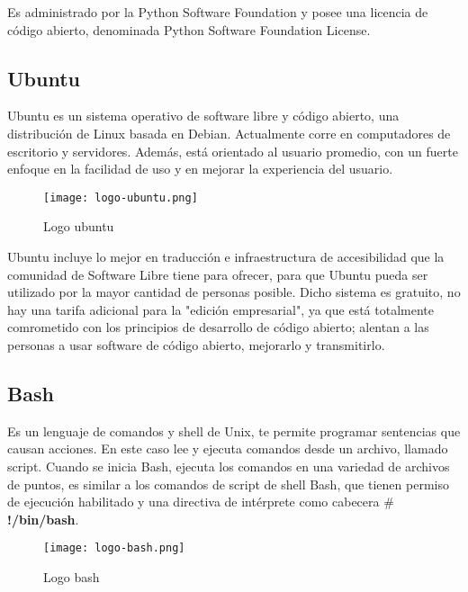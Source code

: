 \documentclass[ spanish, a4paper, 12pt, oneside]{report}
\begin{document}
Es administrado por la Python Software Foundation y posee una licencia de código abierto, denominada Python Software Foundation License.\\
\subsection{Ubuntu}

Ubuntu es un sistema operativo de software libre y código abierto, una distribución de Linux basada en Debian. Actualmente corre en computadores de escritorio y servidores. Además, está orientado al usuario promedio, con un fuerte enfoque en la facilidad de uso y 
en mejorar la experiencia del usuario.\\

\begin{figure}[!h]
   \centering
   \texttt{[image: logo-ubuntu.png]}\\
      \caption{\label{fig: Logo ubuntu} Logo ubuntu}
\end{figure}

Ubuntu incluye lo mejor en traducción e infraestructura de accesibilidad que la comunidad de Software Libre tiene para ofrecer, para que Ubuntu pueda ser utilizado por la mayor cantidad de personas posible. Dicho sistema es gratuito, no hay una tarifa adicional 
para la "edición empresarial", ya que está totalmente comrometido con los principios de desarrollo de código abierto; alentan a las personas a usar software de código abierto, mejorarlo y transmitirlo. \\

\subsection{Bash}

Es un lenguaje de comandos y shell de Unix, te permite programar sentencias que causan acciones. En este caso lee y ejecuta comandos desde un archivo, llamado script. Cuando se inicia Bash, ejecuta los comandos en una variedad de archivos de puntos, es similar a los 
comandos de script de shell Bash, que tienen permiso de ejecución habilitado y una directiva de intérprete como cabecera \textbf{$\#$!/bin/bash}. \\

\begin{figure}[!h]
   \centering
   \texttt{[image: logo-bash.png]}\\
      \caption{\label{fig: Logo bash} Logo bash}
\end{figure}
\end{document}
